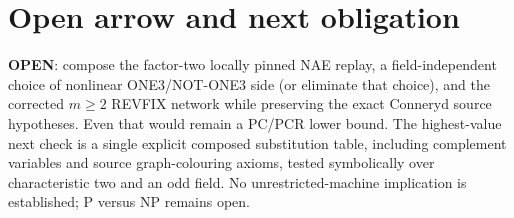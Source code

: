 \documentclass[11pt]{article}
\newcommand{\status}[1]{\textbf{#1}}
\begin{document}
\section*{Open arrow and next obligation}
\status{OPEN}: compose the factor-two locally pinned NAE replay, a field-independent choice of nonlinear ONE3/NOT-ONE3 side (or eliminate that choice), and the corrected $m\geq2$ REVFIX network while preserving the exact Conneryd source hypotheses.  Even that would remain a PC/PCR lower bound.  The highest-value next check is a single explicit composed substitution table, including complement variables and source graph-colouring axioms, tested symbolically over characteristic two and an odd field.  No unrestricted-machine implication is established; P versus NP remains open.

\end{document}
